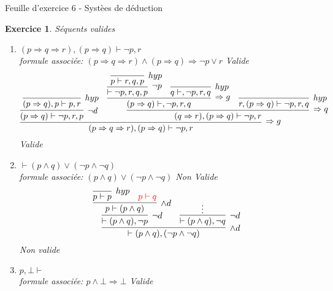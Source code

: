 \documentclass{article}
\theoremstyle{plain}
\newtheorem{exo}{Exercice}%
\begin{document}
\begin{center}
    \large\sc Feuille d'exercice 6 - Systèes de déduction
\end{center}

\begin{exo} Séquents valides
\begin{enumerate}
    \item $(p \Rightarrow q \Rightarrow r), (p \Rightarrow q) \vdash \neg p, r$ \\
        formule associée:
        $(p \Rightarrow q \Rightarrow r) \wedge (p \Rightarrow q)
            \Rightarrow \neg p \vee r$ Valide
        \[
        \infer[\Rightarrow g]{(p \Rightarrow q \Rightarrow r), (p \Rightarrow q) \vdash \neg p, r}
              {
                \infer[\neg d]{(p \Rightarrow q) \vdash \neg p, r, p}
                              {
                                \infer[hyp]{(p\Rightarrow q), p \vdash p, r}{}
                              }
                &\infer[\Rightarrow q]{(q \Rightarrow r), (p \Rightarrow q) \vdash \neg p, r}
                       {
                            \infer[\Rightarrow g]{(p \Rightarrow q) \vdash , \neg p, r, q}
                                  {
                                    \infer[\neg p]{\vdash \neg p, r, q, p}
                                          {\infer[hyp]{p \vdash r, q, p}{}}
                                   &\infer[hyp]{q \vdash, \neg p, r, q}{}
                                  }
                           &\infer[hyp]{r, (p \Rightarrow q) \vdash \neg p, r, q}{}
                       }
              }
        \]
        Valide

    \item $\vdash (p\wedge q) \vee (\neg p \wedge \neg q)$ \\
        formule associée:
        $(p \wedge q) \vee (\neg p \wedge \neg q)$ Non Valide
        \[
        \infer[\wedge d]{\vdash (p \wedge q), (\neg p \wedge \neg q)}
              {
                \infer[\neg d]{\vdash (p \wedge q), \neg p}
                      {
                        \infer[\wedge d]{p \vdash (p\wedge q)}
                              {
                                \infer[hyp]{p \vdash p}{}
                                & \textcolor{red}{p \vdash q}
                              }
                      }
               &\infer[\neg d]{\vdash (p \wedge q), \neg q}
                      { \vdots }
              }
        \]
        Non valide

    \item $p, \bot \vdash$\\
        formule associée: $p \wedge \bot \Rightarrow \bot$ Valide


\end{enumerate}
\end{exo}
\end{document}
